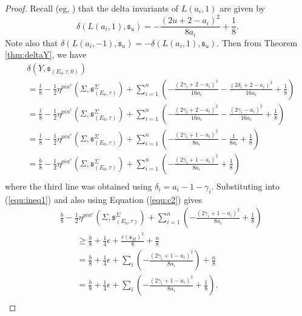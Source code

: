 \documentclass{amsart}
\theoremstyle{definition}
\theoremstyle{remark}
\numberwithin{equation}{section}
\begin{document}
\begin{proof}
Recall (eg, \cite[]{bar}) that the delta invariants of $L(a_i , 1)$ are given by
\[
\delta( L(a_i , 1) , \mathfrak{s}_{u}) = - \frac{ (2u + 2 - a_i)^2 }{8a_i} + \frac{1}{8}.
\]
Note also that $\delta( L(a_i , -1) , \mathfrak{s}_u) = -\delta( L(a_i , 1) , \mathfrak{s}_u)$. Then from Theorem \ref{thm:deltaY}, we have
\begin{align*}
& \delta(Y , \mathfrak{s}_{(E_0 , \tau , 0)}) \\
& = \frac{l}{8} - \frac{1}{2} \eta^{pin^c}(\Sigma , \mathfrak{s}_{(E_0 , \tau)}^\Sigma) + \sum_{i=1}^n \left( - \frac{(2\gamma_i + 2 - a_i)^2}{16a_i} - \frac{(2\delta_i + 2 - a_i)^2}{16a_i} + \frac{1}{8} \right) \\
&=  \frac{l}{8} - \frac{1}{2} \eta^{pin^c}(\Sigma , \mathfrak{s}_{(E_0 , \tau)}^\Sigma) + \sum_{i=1}^n \left( -\frac{(2\gamma_i + 2 - a_i)^2}{16a_i} - \frac{(2\gamma_i - a_i)^2}{16a_i} + \frac{1}{8} \right) \\
&=  \frac{l}{8} - \frac{1}{2} \eta^{pin^c}(\Sigma , \mathfrak{s}_{(E_0 , \tau)}^\Sigma) + \sum_{i=1}^n \left( -\frac{(2\gamma_i + 1 - a_i)^2}{8a_i} - \frac{1}{8a_i} + \frac{1}{8} \right) \\
&= \frac{b}{8} - \frac{1}{2} \eta^{pin^c}(\Sigma , \mathfrak{s}_{(E_0 , \tau)}^\Sigma) + \sum_{i=1}^n \left( -\frac{(2\gamma_i + 1 - a_i)^2}{8a_i} + \frac{1}{8} \right) \\
\end{align*}
where the third line was obtained using $\delta_i = a_i - 1 - \gamma_i$. Substituting into (\ref{equ:ineq1}) and also using Equation (\ref{equ:c2}) gives
\begin{align*}
&\frac{b}{8} - \frac{1}{2} \eta^{pin^c}(\Sigma , \mathfrak{s}_{(E_0 , \tau)}^\Sigma) + \sum_{i=1}^n \left( -\frac{(2\gamma_i + 1 - a_i)^2}{8a_i} + \frac{1}{8} \right) \\
& \quad \quad \ge \frac{b}{8} + \frac{1}{4}\epsilon + \frac{c(\mathfrak{s}_M)^2}{8} + \frac{n}{8} \\
& \quad \quad = \frac{b}{8} + \frac{1}{4}\epsilon + \sum_i \left( -\frac{(2\gamma_i + 1 - a_i)^2}{8a_i} \right) + \frac{n}{8} \\
& \quad \quad = \frac{b}{8} + \frac{1}{4}\epsilon + \sum_i \left( -\frac{(2\gamma_i + 1 - a_i)^2}{8a_i} + \frac{1}{8} \right).\\
\end{align*}


\end{proof}
\end{document}
